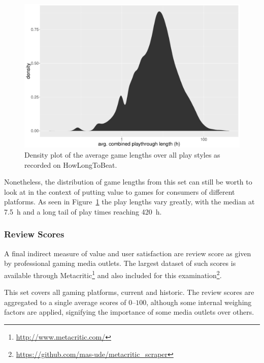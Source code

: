 \begin{figure}[!t]
	\centering
	\includegraphics[width=1.0\columnwidth]{images/gamelengths-density.pdf}
	\caption{Density plot of the average game lengths over all play styles as recorded on HowLongToBeat.}
\label{fig:gamelengths-density}
\end{figure}

Nonetheless, the distribution of game lengths from this set can still be worth to look at in the context of putting value to games for consumers of different platforms. As seen in Figure~\ref{fig:gamelengths-density} the play lengths vary greatly, with the median at \SI{7.5}{\hour} and a long tail of play times reaching \SI{420}{\hour}.



\subsubsection{Review Scores}

A final indirect measure of value and user satisfaction are review score as given by professional gaming media outlets. The largest dataset of such scores is available through Metacritic\footnote{\url{http://www.metacritic.com/}} and also included for this examination\footnote{\url{https://github.com/mas-ude/metacritic_scraper}}.

This set covers all gaming platforms, current and historic. The review scores are aggregated to a single average scores of $0$--$100$, although some internal weighing factors are applied, signifying the importance of some media outlets over others.

